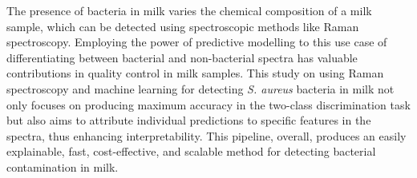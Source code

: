 
The presence of bacteria in milk varies the chemical composition of a milk sample, which can be detected using spectroscopic methods like Raman spectroscopy. Employing the power of predictive modelling to this use case of differentiating between bacterial and non-bacterial spectra has valuable contributions in quality control in milk samples. This study on using Raman spectroscopy and machine learning for detecting \textit{S. aureus} bacteria in milk not only focuses on producing maximum accuracy in the two-class discrimination task but also aims to attribute individual predictions to specific features in the spectra, thus enhancing interpretability. This pipeline, overall, produces an easily explainable, fast, cost-effective, and scalable method for detecting bacterial contamination in milk. 